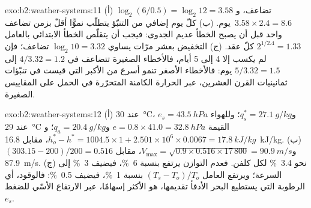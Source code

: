 \begin{solution}{exo:b2:weather-systems:11}
(أ) $\log_2(6/0.5) = \log_2 12 = 3.58$ تضاعف، و$3.58 \times 2.4 = 8.6$~يوم. (ب) كلّ
يوم إضافي من التنبّؤ يتطلّب نموًّا أقلّ بزمن تضاعف واحد قبل أن يصبح الخطأ عديم الجدوى: فيجب أن
يتقلّص الخطأ الابتدائي بالعامل $2^{1/2.4} = 1.33$ كلّ عقد. (ج) التخفيض بعشر مرّات يساوي
$\log_2 10 = 3.32$ تضاعف؛ فإن لم يكسب إلا 4 إلى 5 أيام، فالأخطاء الصغيرة تتضاعف في $4/3.32 = 1.2$
إلى $5/3.32 = 1.5$ يوم: فالأخطاء الأصغر تنمو أسرع من الأكبر التي قيست في
تنبّؤات ثمانينيات القرن العشرين، عبر الحرارة الكامنة المتحرّرة في الحمل على المقاييس الصغيرة.
\end{solution}

\begin{solution}{exo:b2:weather-systems:12}
(أ) عند \qty{30}{\celsius}، $e_s = \qty{43.5}{hPa}$ و$q_s^* = \qty{27.1}{g/kg}$؛ وللهواء عند
\qty{29}{\celsius} القيمة $e = 0.8 \times 41.0 = \qty{32.8}{hPa}$ و$q_a = \qty{20.4}{g/kg}$؛
و$h_o^* - h^* = 1004.5 \times 1 + 2.501 \times 10^6 \times 0.0067 = \qty{17.8}{kJ/kg}$، مقابل
\qty{16.8}{kJ/kg}. (ب) $(303.15 - 200)/200 = 0.516$ و$V_{\max} = \sqrt{0.9 \times 0.516
\times 17\,800} = \qty{90.9}{m/s}$، مقابل \qty{87.9}{m/s}. (ج) نحو \qty{3.4}{\percent} لكل
كلفن. فعدم التوازن يرتفع بنسبة \qty{6}{\percent}، فيضيف \qty{3}{\percent} إلى السرعة؛
ويرتفع العامل $(T_s - T_o)/T_o$ بنسبة \qty{1}{\percent}، فيضيف \qty{0.5}{\percent}: فالوقود،
أي الرطوبة التي يستطيع البحر الأدفأ تقديمها، هو الأكثر إسهامًا، عبر الارتفاع الأسّي
للضغط $e_s$.
\end{solution}

